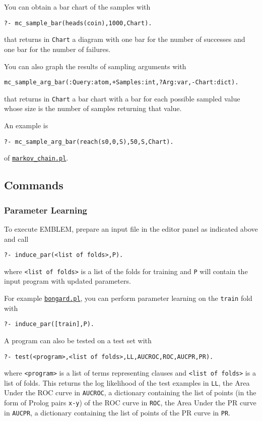 \documentclass[a4paper,10pt]{scrartcl}
\begin{document}
You can obtain a bar chart of the samples with
\begin{verbatim}
?- mc_sample_bar(heads(coin),1000,Chart).
\end{verbatim}
that returns in \verb|Chart| a diagram with one bar for the number of successes and 
one bar for the number of failures.

You can also graph the results of sampling arguments with
\begin{verbatim}
mc_sample_arg_bar(:Query:atom,+Samples:int,?Arg:var,-Chart:dict).
\end{verbatim} 
that returns in \verb|Chart| a bar chart with a bar for each possible sampled value whose size is the number of samples
returning that value.

An example is
\begin{verbatim}
?- mc_sample_arg_bar(reach(s0,0,S),50,S,Chart). 
\end{verbatim}
of \href{http://cplint.lamping.unife.it/example/inference/markov_chain.pl}{\texttt{markov\_chain.pl}}.





\subsection{Commands}
\subsubsection{Parameter Learning}
To execute EMBLEM, prepare an input file in the editor panel as indicated above 
and call
\begin{verbatim}
?- induce_par(<list of folds>,P).
\end{verbatim}
where \verb|<list of folds>| is a list of the folds for training and
\verb|P| will contain the input program with updated parameters.

For example \href{http://cplint.lamping.unife.it/example/bongard.pl}{\texttt{bongard.pl}}, you can 
perform parameter learning on the \verb|train| fold with 
\begin{verbatim}
?- induce_par([train],P).
\end{verbatim}
A program can also be tested on a test set with
\begin{verbatim}
?- test(<program>,<list of folds>,LL,AUCROC,ROC,AUCPR,PR).
\end{verbatim}
where \verb|<program>| is a list of terms representing clauses and
\verb|<list of folds>| is a list of folds.
This returns the log likelihood of the test examples in \verb|LL|, the Area Under the ROC curve in \verb|AUCROC|, a dictionary containing the list of points (in the form of Prolog pairs \verb|x-y|) of the ROC curve in \verb|ROC|,
the Area Under the PR curve in \verb|AUCPR|, a dictionary containing the list of points of the PR curve in \verb|PR|.
\end{document}
